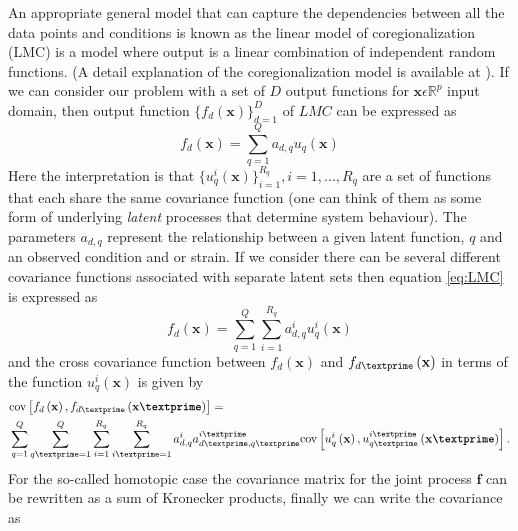 An appropriate general model that can capture the dependencies between all the data points and conditions is known as the linear model of coregionalization (LMC) is a model where output is a linear combination of independent random functions. (A detail explanation of the coregionalization model is available at \cite{Alvarez:2011, Alvarez:2012}). If we can consider our problem with a set of $D$ output functions for $\textbf{x}\epsilon\mathbb{R}^p$ input domain, then output function $\{ f_d\left(\textbf{x}\right)\}^D_{d=1}$ of $LMC$ can be expressed as
\begin{equation} \label{eq:LMC}
f_d\left(\textbf{x}\right)=\sum\limits_{q=1}^Q a_{d,q}u_q\left(\textbf{x}\right)
\end{equation}
Here the interpretation is that $\{u_q^i\left(\textbf{x}\right)\}^{R_q}_{i=1}, i= 1,..., R_q$ are a set of functions that each share the same covariance function (one can think of them as some form of underlying \emph{latent} processes that determine system behaviour). The parameters $a_{d, q}$ represent the relationship between a given latent function, $q$ and an observed condition and or strain. If we consider there can be several different covariance functions associated with separate latent sets then equation \ref{eq:LMC} is expressed as
\begin{equation} \label{eq:LMClatent}
f_d\left(\textbf{x}\right)=\sum\limits_{q=1}^Q \sum\limits_{i=1}^{R_q} a^i_{d,q}u^i_q\left(\textbf{x}\right)
\end{equation}
and the cross covariance function between $f_d\left(\textbf{x}\right)$ and 
$f_{d\textprime}\left(\textbf{x}\right)$ in terms of the function $u^i_q\left(\textbf{x}\right)$
is given by
\begin{equation} \label{eq:LMCcov}
\begin{split}
&\text{cov} \left[ f_d\left(\textbf{x}\right), f_{d\textprime}\left(\textbf{x\textprime}\right)\right]=\\
&\sum\limits_{q=1}^Q \sum\limits_{q\textprime=1}^Q \sum\limits_{i=1}^{R_q} \sum\limits_{i\textprime=1}^{R_q}
a^i_{d,q}a^{i\textprime}_{d\textprime,q\textprime} 
\text{cov} \left[ u^i_q\left(\textbf{x}\right),u^{i\textprime}_{q\textprime}\left(\textbf{x\textprime}\right) \right].
\end{split}
\end{equation}
For the so-called homotopic case \cite{Alvarez:2011, Wackernagel:2003} the covariance matrix for the joint process $\textbf{f}$ can be rewritten as a sum of Kronecker products, finally we can write the covariance as
